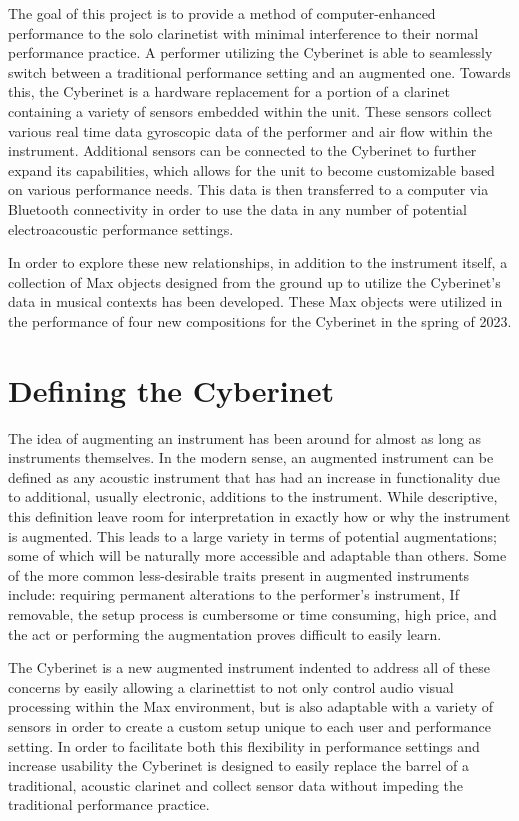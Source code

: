The goal of this project is to provide a method of computer-enhanced performance to the solo clarinetist with minimal interference to their normal performance practice. A performer utilizing the Cyberinet is able to seamlessly switch between a traditional performance setting and an augmented one. Towards this, the Cyberinet is a hardware replacement for a portion of a clarinet containing a variety of sensors embedded within the unit. These sensors collect various real time data gyroscopic data of the performer and air flow within the instrument. Additional sensors can be connected to the Cyberinet to further expand its capabilities, which allows for the unit to become customizable based on various performance needs. This data is then transferred to a computer via Bluetooth connectivity in order to use the data in any number of potential electroacoustic performance settings. 

In order to explore these new relationships, in addition to the instrument itself, a collection of Max objects designed from the ground up to utilize the Cyberinet’s data in musical contexts has been developed. These Max objects were utilized in the performance of four new compositions for the Cyberinet in the spring of 2023.

\mainmatter
\chapter{Defining the Cyberinet}

The idea of augmenting an instrument has been around for almost as long as instruments themselves. In the modern sense, an augmented instrument can be defined as any acoustic instrument that has had an increase in functionality due to additional, usually electronic, additions to the instrument\cite{miranda_Wanderley_instrumentControl_2006}. While descriptive, this definition leave room for interpretation in exactly how or why the instrument is augmented. This leads to a large variety in terms of potential augmentations; some of which will be naturally more accessible and adaptable than others. Some of the more common less-desirable traits present in augmented instruments include: requiring permanent alterations to the performer's instrument, If removable, the setup process is cumbersome or time consuming, high price, and the act or performing the augmentation proves difficult to easily learn. 

The Cyberinet is a new augmented instrument indented to address all of these concerns by easily allowing a clarinettist to not only control audio visual processing within the Max environment, but is also adaptable with a variety of sensors in order to create a custom setup unique to each user and performance setting. In order to facilitate both this flexibility in performance settings and increase usability the Cyberinet is designed to easily replace the barrel of a traditional, acoustic clarinet and collect sensor data without impeding the traditional performance practice.

